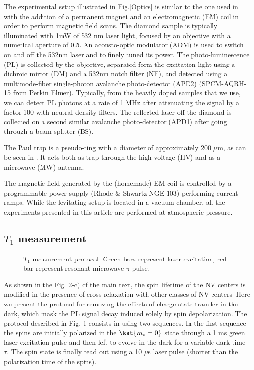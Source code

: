 \documentclass[preprintnumbers,amsmath,amssymb,onecolumn,12pt]{revtex4}
\begin{document}
The experimental setup illustrated in Fig.\ref{Optics} is similar to the one used in \citep{DelordPRL} with the addition of a permanent magnet and an electromagnetic (EM) coil in order to perform magnetic field scans. The diamond sample is typically illuminated with 1mW of 532 nm laser light, focused by an objective with a numerical aperture of 0.5. An acousto-optic modulator (AOM) is used to switch on and off the 532nm laser and to finely tuned its power. The photo-luminescence (PL) is collected by the objective, separated form the excitation light using a dichroic mirror (DM) and a 532nm notch filter (NF), and detected using a multimode-fiber single-photon avalanche photo-detector (APD2) (SPCM-AQRH-15 from Perkin Elmer). Typically, from the heavily doped samples that we use, we can detect PL photons at a rate of 1 MHz after attenuating the signal by a factor 100 with neutral density filters. 
The reflected laser off the diamond is collected on a second similar avalanche photo-detector (APD1) after going through a beam-splitter (BS).

The Paul trap is a pseudo-ring with a diameter of approximately 200 $\mu$m, as can be seen in \citep{DelordPhD}. It acts both as trap through the high voltage (HV) and as a microwave (MW) antenna.

The magnetic field generated by the (homemade) EM coil is controlled by a programmable power supply (Rhode \& Shwartz NGE 103) performing current ramps.
While the levitating setup is located in a vacuum chamber, all the experiments presented in this article are performed at atmospheric pressure.

\subsection{$T_1$ measurement}
\begin{figure}[!ht]
  \centering {}
  \caption{$T_1$ measurement protocol. Green bars represent laser excitation, red bar represent resonant microwave $\pi$ pulse.}
	\label{T1_protocol}
\end{figure}

As shown in the Fig. 2-c) of the main text, the spin lifetime of the NV centers is modified in the presence of cross-relaxation with other classes of NV centers.
Here we present the protocol for removing the effects of charge state transfer in the dark, which mask the PL signal decay induced solely by spin depolarization. 
The protocol described in Fig. \ref{T1_protocol} consists in using two sequences. In the first sequence the spins are initially polarized in the $\ket{m_s=0}$ state through a 1 ms green laser excitation pulse and then left to evolve in the dark for a variable dark time $\tau$. The spin state is finally read out using a 10 $\mu$s laser pulse (shorter than the polarization time of the spins).
\end{document}
